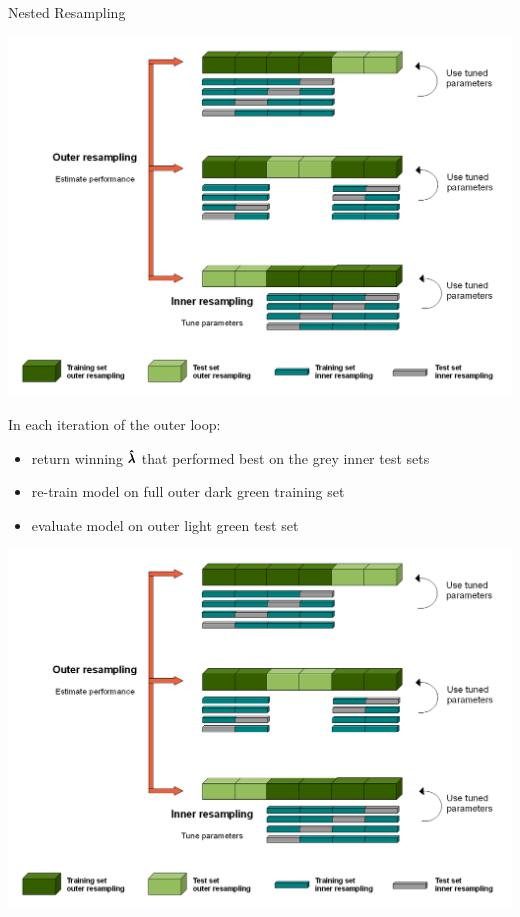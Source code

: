 \begin{frame}[c,allowframebreaks]{Nested Resampling}
    \begin{center}
        \includegraphics[height=0.55\textheight]{Nested_Resampling.png}
    \end{center}

    \framebreak

    \begin{footnotesize}
    In each iteration of the outer loop:
    \begin{itemize}
    \item return winning $\pmb{\hat{\lambda}}$ that performed best on the grey inner test sets
    \item re-train model on full outer dark green training set
    \item evaluate model on outer light green test set
    \end{itemize}
    \end{footnotesize}

    \begin{center}
        \includegraphics[height=0.55\textheight]{Nested_Resampling.png}
    \end{center}


\end{frame}
